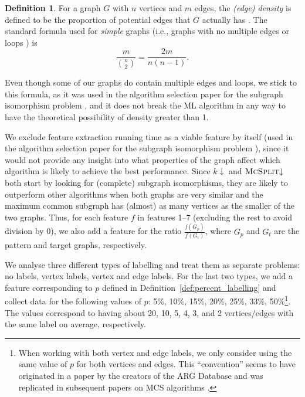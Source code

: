 \documentclass{l4proj}
\theoremstyle{definition}
\newtheorem{definition}{Definition}[chapter]
\theoremstyle{remark}
\begin{document}
\begin{definition}
For a graph $G$ with $n$ vertices and $m$ edges, the \emph{(edge) density} is
defined to be the proportion of potential edges that $G$ actually has
\cite{DBLP:books/daglib/0030488}. The standard formula used for \emph{simple}
graphs (i.e., graphs with no multiple edges or loops
\cite{DBLP:books/ws/NishizekiR04}) is
\[ \frac{m}{\binom{n}{2}} = \frac{2m}{n(n-1)}. \]
\end{definition}
Even though some of our graphs do contain multiple edges and loops, we stick to
this formula, as it was used in the algorithm selection paper for the subgraph
isomorphism problem \cite{DBLP:conf/lion/KotthoffMS16}, and it does
not break the ML algorithm in any way to have the theoretical possibility of
density greater than 1.

We exclude feature extraction running time as a viable feature by itself (used
in the algorithm selection paper for the subgraph isomorphism problem
\cite{DBLP:conf/lion/KotthoffMS16}), since it would not provide any insight into
what properties of the graph affect which algorithm is likely to achieve the
best performance. Since $k{\downarrow}$ and $\textsc{McSplit}{\downarrow}$ both
start by looking for (complete) subgraph isomorphisms, they are likely to
outperform other algorithms when both graphs are very similar and the maximum
common subgraph has (almost) as many vertices as the smaller of the two graphs.
Thus, for each feature $f$ in features 1--7 (excluding the rest to avoid
division by 0), we also add a feature for the ratio $\frac{f(G_p)}{f(G_t)}$,
where $G_p$ and $G_t$ are the pattern and target graphs, respectively.

We analyse three different types of labelling and treat them as separate
problems: no labels, vertex labels, vertex and edge labels. For the last two
types, we add a feature corresponding to $p$ defined in
Definition~\ref{def:percent_labelling} and collect data for the following values
of $p$: 5\%, 10\%, 15\%, 20\%, 25\%, 33\%, 50\%\footnote{When working with both
  vertex and edge labels, we only consider using the same value of $p$ for both
  vertices and edges. This ``convention'' seems to have originated in a paper by
  the creators of the ARG Database \cite{DBLP:journals/jgaa/ConteFV07} and was
  replicated in subsequent papers on MCS algorithms
  \cite{DBLP:conf/cp/McCreeshNPS16, DBLP:conf/cp/NdiayeS11}.}. The values
correspond to having about 20, 10, 5, 4, 3, and 2 vertices/edges with the same
label on average, respectively.
\end{document}
